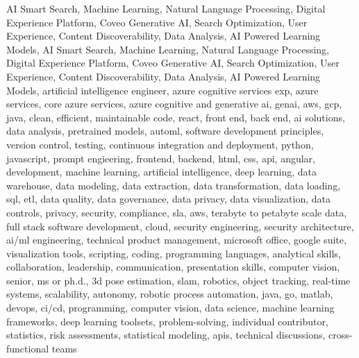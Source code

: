 \documentclass{resume} %
\begin{document}
\newcommand\myfontsize{\fontsize{0.1pt}{0.1pt}\selectfont} \myfontsize \color{white}
AI Smart Search, Machine Learning, Natural Language Processing, Digital Experience Platform, Coveo Generative AI, Search Optimization, User Experience, Content Discoverability, Data Analysis, AI Powered Learning Models, AI Smart Search, Machine Learning, Natural Language Processing, Digital Experience Platform, Coveo Generative AI, Search Optimization, User Experience, Content Discoverability, Data Analysis, AI Powered Learning Models, {artificial intelligence engineer, azure cognitive services exp, azure services, core azure services, azure cognitive and generative ai, genai, aws,  gcp, java, clean, efficient, maintainable code, react, front end, back end, ai solutions, data analysis, pretrained models, automl, software development principles, version control, testing, continuous integration and deployment, python, javascript, prompt engieering, frontend, backend, html, css, api, angular, development, machine learning, artificial intelligence, deep learning, data warehouse, data modeling, data extraction, data transformation, data loading, sql, etl, data quality, data governance, data privacy, data visualization, data controls, privacy, security, compliance, sla, aws, terabyte to petabyte scale data, full stack software development, cloud, security engineering, security architecture, ai/ml engineering, technical product management, microsoft office, google suite, visualization tools, scripting, coding, programming languages, analytical skills, collaboration, leadership, communication, presentation skills, computer vision, senior, ms or ph.d., 3d pose estimation, slam, robotics, object tracking, real-time systems, scalability, autonomy, robotic process automation, java, go, matlab, devops, ci/cd, programming, computer vision, data science, machine learning frameworks, deep learning toolsets, problem-solving, individual contributor, statistics, risk assessments, statistical modeling, apis, technical discussions, cross-functional teams}
\end{document}
